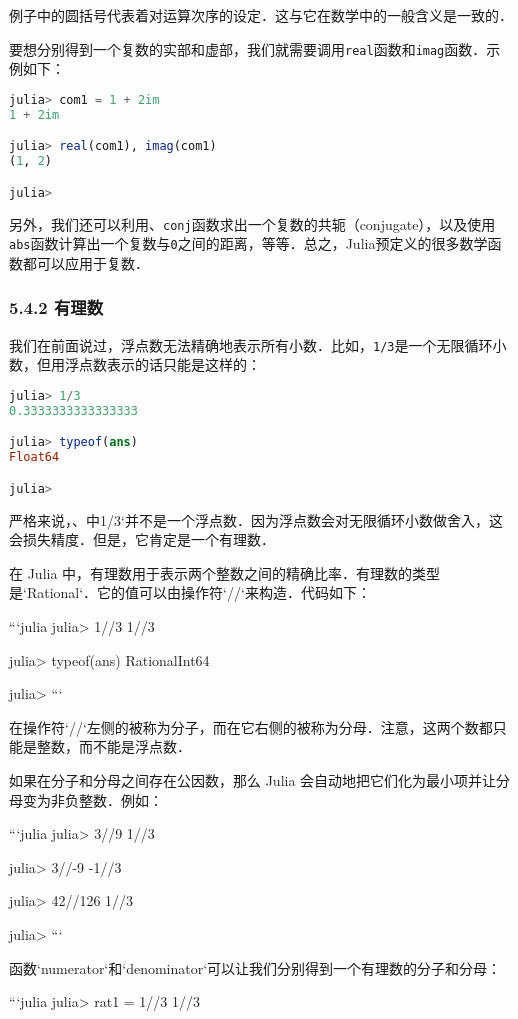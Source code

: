 例子中的圆括号代表着对运算次序的设定．这与它在数学中的一般含义是一致的．

要想分别得到一个复数的实部和虚部，我们就需要调用\verb|real|函数和\verb|imag|函数．示例如下：
\begin{lstlisting}[language=julia]
julia> com1 = 1 + 2im 
1 + 2im

julia> real(com1), imag(com1)
(1, 2)

julia> 
\end{lstlisting}

另外，我们还可以利用、\verb|conj|函数求出一个复数的共轭（conjugate），以及使用\verb|abs|函数计算出一个复数与\verb|0|之间的距离，等等．总之，Julia预定义的很多数学函数都可以应用于复数．

\subsubsection{5.4.2 有理数}

我们在前面说过，浮点数无法精确地表示所有小数．比如，\verb|1/3|是一个无限循环小数，但用浮点数表示的话只能是这样的：
\begin{lstlisting}[language=julia]
julia> 1/3
0.3333333333333333

julia> typeof(ans)
Float64

julia> 
\end{lstlisting}

严格来说，、中1/3`并不是一个浮点数．因为浮点数会对无限循环小数做舍入，这会损失精度．但是，它肯定是一个有理数．

在 Julia 中，有理数用于表示两个整数之间的精确比率．有理数的类型是`Rational`．它的值可以由操作符`//`来构造．代码如下：

```julia
julia> 1//3
1//3

julia> typeof(ans)
Rational{Int64}

julia> 
```

在操作符`//`左侧的被称为分子，而在它右侧的被称为分母．注意，这两个数都只能是整数，而不能是浮点数．

如果在分子和分母之间存在公因数，那么 Julia 会自动地把它们化为最小项并让分母变为非负整数．例如：

```julia
julia> 3//9
1//3

julia> 3//-9
-1//3

julia> 42//126
1//3

julia> 
```

函数`numerator`和`denominator`可以让我们分别得到一个有理数的分子和分母：

```julia
julia> rat1 = 1//3
1//3

